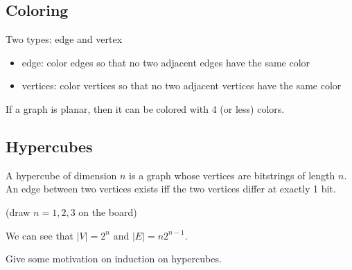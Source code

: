 \subsection{Coloring}
Two types: edge and vertex 
\begin{itemize}
    \item edge: color edges so that no two adjacent edges have the same color
    \item vertices: color vertices so that no two adjacent vertices have the same color 
\end{itemize}


\begin{theorem}
    If a graph is planar, then it can be colored with 4 (or less) colors. 
\end{theorem}

\subsection{Hypercubes}
A hypercube of dimension $n$ is a graph whose vertices are bitstrings of length $n$. An edge between two vertices exists iff the two vertices differ at exactly 1 bit. 

(draw $n = 1, 2, 3$ on the board)

We can see that $|V| = 2^n$ and $|E| = n 2^{n-1}$. 

Give some motivation on induction on hypercubes. 